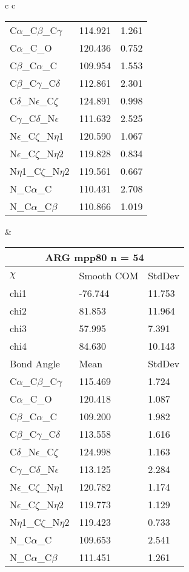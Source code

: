 \begin{longtable}{ c c }
\begin{tabular}{ l l l }
  C$\alpha$\_C$\beta$\_C$\gamma$ & 114.921 & 1.261\\
  C$\alpha$\_C\_O & 120.436 & 0.752\\
  C$\beta$\_C$\alpha$\_C & 109.954 & 1.553\\
  C$\beta$\_C$\gamma$\_C$\delta$ & 112.861 & 2.301\\
  C$\delta$\_N$\epsilon$\_C$\zeta$ & 124.891 & 0.998\\
  C$\gamma$\_C$\delta$\_N$\epsilon$ & 111.632 & 2.525\\
  N$\epsilon$\_C$\zeta$\_N$\eta$1 & 120.590 & 1.067\\
  N$\epsilon$\_C$\zeta$\_N$\eta$2 & 119.828 & 0.834\\
  N$\eta$1\_C$\zeta$\_N$\eta$2 & 119.561 & 0.667\\
  N\_C$\alpha$\_C & 110.431 & 2.708\\
  N\_C$\alpha$\_C$\beta$ & 110.866 & 1.019\\
  \bottomrule
  \end{tabular}
  &
  \begin{tabular}{ l l l }
  \toprule
  \multicolumn{3}{c}{ARG \textbf{mpp80} n = 54} \\ \toprule
  $\chi$       & Smooth COM & StdDev \\ \midrule
  chi1 & -76.744 & 11.753 \\ 
  chi2 & 81.853 & 11.964 \\ 
  chi3 & 57.995 & 7.391 \\ 
  chi4 & 84.630 & 10.143 \\ \midrule
  Bond Angle   & Mean     & StdDev \\ \midrule
  C$\alpha$\_C$\beta$\_C$\gamma$ & 115.469 & 1.724\\
  C$\alpha$\_C\_O & 120.418 & 1.087\\
  C$\beta$\_C$\alpha$\_C & 109.200 & 1.982\\
  C$\beta$\_C$\gamma$\_C$\delta$ & 113.558 & 1.616\\
  C$\delta$\_N$\epsilon$\_C$\zeta$ & 124.998 & 1.163\\
  C$\gamma$\_C$\delta$\_N$\epsilon$ & 113.125 & 2.284\\
  N$\epsilon$\_C$\zeta$\_N$\eta$1 & 120.782 & 1.174\\
  N$\epsilon$\_C$\zeta$\_N$\eta$2 & 119.773 & 1.129\\
  N$\eta$1\_C$\zeta$\_N$\eta$2 & 119.423 & 0.733\\
  N\_C$\alpha$\_C & 109.653 & 2.541\\
  N\_C$\alpha$\_C$\beta$ & 111.451 & 1.261\\

\end{tabular}
\end{longtable}
